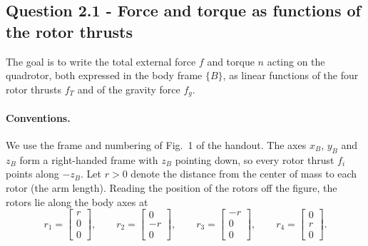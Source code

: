 \subsection*{Question 2.1 - Force and torque as functions of the rotor thrusts}

The goal is to write the total external force $f$ and torque $n$ acting on the quadrotor, both expressed in the body frame $\{B\}$, as linear functions of the four rotor thrusts $f_T$ and of the gravity force $f_g$.

\paragraph{Conventions.}
We use the frame and numbering of Fig.~1 of the handout.
The axes $x_B$, $y_B$ and $z_B$ form a right-handed frame with $z_B$ pointing down, so every rotor thrust $f_i$ points along $-z_B$.
Let $r > 0$ denote the distance from the center of mass to each rotor (the arm length).
Reading the position of the rotors off the figure, the rotors lie along the body axes at
\begin{equation*}
r_1 = \begin{bmatrix} r \\ 0 \\ 0 \end{bmatrix}, \qquad
r_2 = \begin{bmatrix} 0 \\ -r \\ 0 \end{bmatrix}, \qquad
r_3 = \begin{bmatrix} -r \\ 0 \\ 0 \end{bmatrix}, \qquad
r_4 = \begin{bmatrix} 0 \\ r \\ 0 \end{bmatrix}.
\end{equation*}

